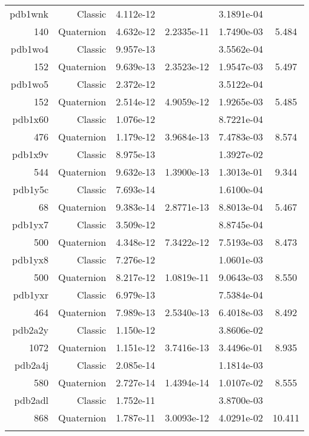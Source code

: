 \begin{xltabular}{\textwidth}{r|rS[table-format=1.3e+2]S[table-format=1.4e+2]S[table-format=1.4e+2]S[table-format=-1.3]}
pdb1wnk & Classic & 4.112e-12 &  & 3.1891e-04 & \\
140 & Quaternion & 4.632e-12 & 2.2335e-11 & 1.7490e-03 & 5.484\\  \addlinespace
pdb1wo4 & Classic & 9.957e-13 &  & 3.5562e-04 & \\
152 & Quaternion & 9.639e-13 & 2.3523e-12 & 1.9547e-03 & 5.497\\  \addlinespace
pdb1wo5 & Classic & 2.372e-12 &  & 3.5122e-04 & \\
152 & Quaternion & 2.514e-12 & 4.9059e-12 & 1.9265e-03 & 5.485\\  \addlinespace
pdb1x60 & Classic & 1.076e-12 &  & 8.7221e-04 & \\
476 & Quaternion & 1.179e-12 & 3.9684e-13 & 7.4783e-03 & 8.574\\  \addlinespace
pdb1x9v & Classic & 8.975e-13 &  & 1.3927e-02 & \\
544 & Quaternion & 9.632e-13 & 1.3900e-13 & 1.3013e-01 & 9.344\\  \addlinespace
pdb1y5c & Classic & 7.693e-14 &  & 1.6100e-04 & \\
68 & Quaternion & 9.383e-14 & 2.8771e-13 & 8.8013e-04 & 5.467\\  \addlinespace
pdb1yx7 & Classic & 3.509e-12 &  & 8.8745e-04 & \\
500 & Quaternion & 4.348e-12 & 7.3422e-12 & 7.5193e-03 & 8.473\\  \addlinespace
pdb1yx8 & Classic & 7.276e-12 &  & 1.0601e-03 & \\
500 & Quaternion & 8.217e-12 & 1.0819e-11 & 9.0643e-03 & 8.550\\  \addlinespace
pdb1yxr & Classic & 6.979e-13 &  & 7.5384e-04 & \\
464 & Quaternion & 7.989e-13 & 2.5340e-13 & 6.4018e-03 & 8.492\\  \addlinespace
pdb2a2y & Classic & 1.150e-12 &  & 3.8606e-02 & \\
1072 & Quaternion & 1.151e-12 & 3.7416e-13 & 3.4496e-01 & 8.935\\  \addlinespace
pdb2a4j & Classic & 2.085e-14 &  & 1.1814e-03 & \\
580 & Quaternion & 2.727e-14 & 1.4394e-14 & 1.0107e-02 & 8.555\\  \addlinespace
pdb2adl & Classic & 1.752e-11 &  & 3.8700e-03 & \\
868 & Quaternion & 1.787e-11 & 3.0093e-12 & 4.0291e-02 & 10.411\\  \addlinespace

\end{xltabular}
